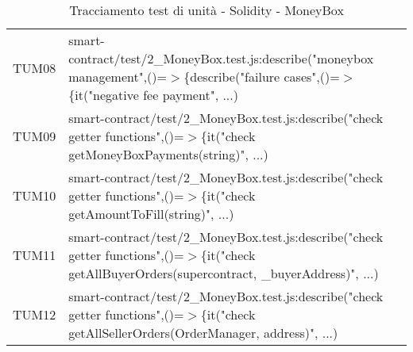 \begin{table}[H]
\begin{tabular}{c|p{15cm}}
    TUM08 & smart-contract/test/2\_MoneyBox.test.js:describe("moneybox management",\newline()=$>$\{describe("failure cases",()=$>$\{it("negative fee payment", ...)                                          \\
    TUM09 & smart-contract/test/2\_MoneyBox.test.js:describe("check getter functions",\newline()=$>$\{it("check getMoneyBoxPayments(string)", ...)                                \\
    TUM10 & smart-contract/test/2\_MoneyBox.test.js:describe("check getter functions",\newline()=$>$\{it("check getAmountToFill(string)", ...)                                    \\
    TUM11 & smart-contract/test/2\_MoneyBox.test.js:describe("check getter functions",\newline()=$>$\{it("check getAllBuyerOrders(supercontract, \_buyerAddress)", ...)                                                          \\
    TUM12 & smart-contract/test/2\_MoneyBox.test.js:describe("check getter functions",\newline()=$>$\{it("check getAllSellerOrders(OrderManager, address)", ...)                                                      \\
  \end{tabular}
  \caption{Tracciamento test di unità - Solidity - MoneyBox}
\end{table}